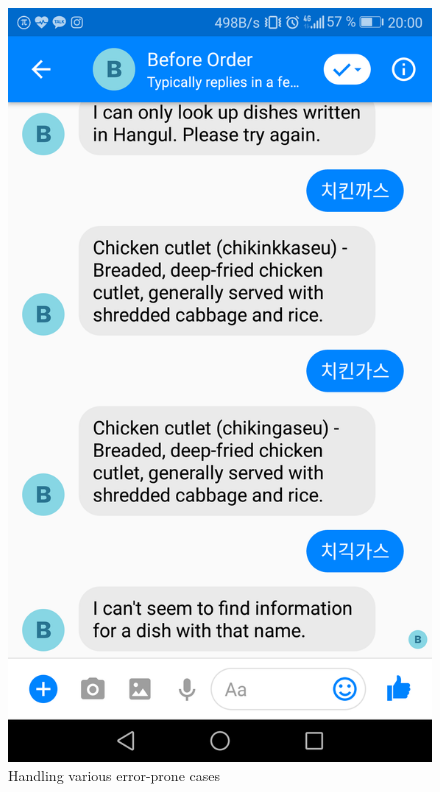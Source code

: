 \begin{figure}[htbp]
\centerline{\includegraphics[height=\custompicheight]{./pictures/Screenshot_20181125-200020}}
\caption{Handling various error-prone cases}
\label{fig:Before Order_features}
\end{figure}
\FloatBarrier
